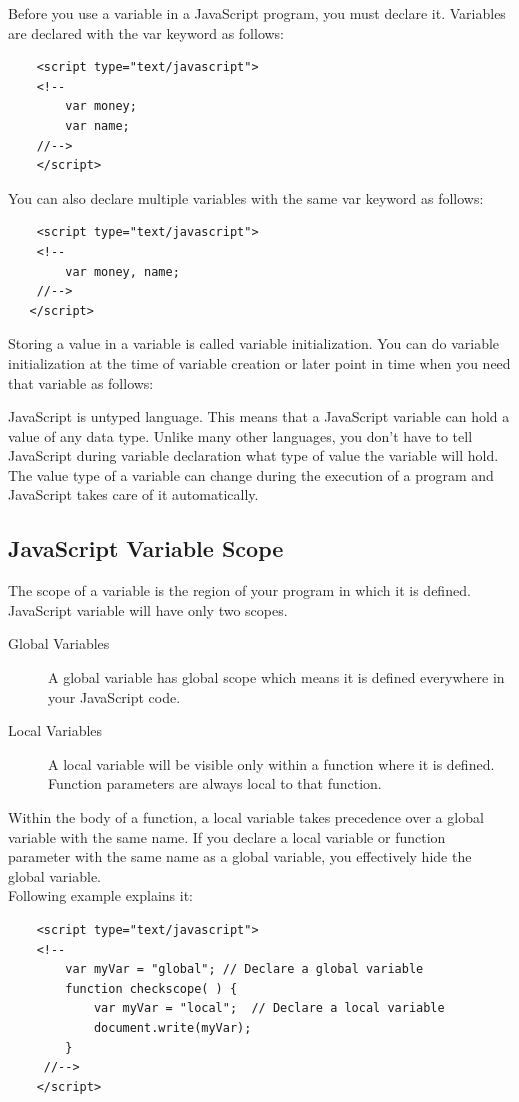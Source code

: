 \documentclass[11pt,a4paper]{article}
\begin{document}
Before you use a variable in a JavaScript program, you must declare it. Variables are declared with the var keyword as follows:
\begin{verbatim}
    <script type="text/javascript">
    <!--
        var money;
        var name;
    //-->
    </script>
\end{verbatim}

You can also declare multiple variables with the same var keyword as follows:
\begin{verbatim}
    <script type="text/javascript">
    <!--
        var money, name;
    //-->
   </script>
\end{verbatim}
Storing a value in a variable is called variable initialization. You can do variable initialization at the time of variable creation or later point in time when you need that variable as follows:

JavaScript is untyped language. This means that a JavaScript variable can hold a value of any data type. Unlike many other languages, you don't have to tell JavaScript during variable declaration what type of value the variable will hold. The value type of a variable can change during the execution of a program and JavaScript takes care of it automatically.

\subsection*{JavaScript Variable Scope}

The scope of a variable is the region of your program in which it is defined. JavaScript variable will have only two scopes.
\begin{description}
\item[Global Variables] A global variable has global scope which means it is defined everywhere in your JavaScript code.
\item[Local Variables] A local variable will be visible only within a function where it is defined. Function parameters are always local to that function.
\end{description}

Within the body of a function, a local variable takes precedence over a global variable with the same name. If you declare a local variable or function parameter with the same name as a global variable, you effectively hide the global variable.\\

Following example explains it:
\begin{verbatim}
    <script type="text/javascript">
    <!--
        var myVar = "global"; // Declare a global variable
        function checkscope( ) {
            var myVar = "local";  // Declare a local variable
            document.write(myVar);
        }
     //-->
    </script>
\end{verbatim}
\end{document}
